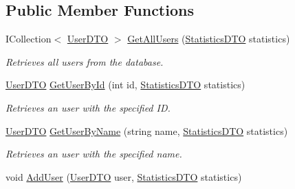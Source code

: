 \subsection*{Public Member Functions}
\begin{DoxyCompactItemize}
\item 
I\+Collection$<$ \mbox{\hyperlink{class_gielda_l2_1_1_i_n_f_r_a_s_t_r_u_c_t_u_r_e_1_1_d_t_o_1_1_user_d_t_o}{User\+D\+TO}} $>$ \mbox{\hyperlink{interface_gielda_l2_1_1_i_n_f_r_a_s_t_r_u_c_t_u_r_e_1_1_interfaces_1_1_i_user_service_a3eccdbcf26de6b86ae770f0e3512664e}{Get\+All\+Users}} (\mbox{\hyperlink{class_gielda_l2_1_1_i_n_f_r_a_s_t_r_u_c_t_u_r_e_1_1_d_t_o_1_1_statistics_d_t_o}{Statistics\+D\+TO}} statistics)
\begin{DoxyCompactList}\small\item\em Retrieves all users from the database. \end{DoxyCompactList}\item 
\mbox{\hyperlink{class_gielda_l2_1_1_i_n_f_r_a_s_t_r_u_c_t_u_r_e_1_1_d_t_o_1_1_user_d_t_o}{User\+D\+TO}} \mbox{\hyperlink{interface_gielda_l2_1_1_i_n_f_r_a_s_t_r_u_c_t_u_r_e_1_1_interfaces_1_1_i_user_service_a2fd0719208e4bd393517dece3b039564}{Get\+User\+By\+Id}} (int id, \mbox{\hyperlink{class_gielda_l2_1_1_i_n_f_r_a_s_t_r_u_c_t_u_r_e_1_1_d_t_o_1_1_statistics_d_t_o}{Statistics\+D\+TO}} statistics)
\begin{DoxyCompactList}\small\item\em Retrieves an user with the specified ID. \end{DoxyCompactList}\item 
\mbox{\hyperlink{class_gielda_l2_1_1_i_n_f_r_a_s_t_r_u_c_t_u_r_e_1_1_d_t_o_1_1_user_d_t_o}{User\+D\+TO}} \mbox{\hyperlink{interface_gielda_l2_1_1_i_n_f_r_a_s_t_r_u_c_t_u_r_e_1_1_interfaces_1_1_i_user_service_a438bd5d0424677c7797ce1ec00d132dc}{Get\+User\+By\+Name}} (string name, \mbox{\hyperlink{class_gielda_l2_1_1_i_n_f_r_a_s_t_r_u_c_t_u_r_e_1_1_d_t_o_1_1_statistics_d_t_o}{Statistics\+D\+TO}} statistics)
\begin{DoxyCompactList}\small\item\em Retrieves an user with the specified name. \end{DoxyCompactList}\item 
void \mbox{\hyperlink{interface_gielda_l2_1_1_i_n_f_r_a_s_t_r_u_c_t_u_r_e_1_1_interfaces_1_1_i_user_service_a964c730457bbce497d33fed5fda0b103}{Add\+User}} (\mbox{\hyperlink{class_gielda_l2_1_1_i_n_f_r_a_s_t_r_u_c_t_u_r_e_1_1_d_t_o_1_1_user_d_t_o}{User\+D\+TO}} user, \mbox{\hyperlink{class_gielda_l2_1_1_i_n_f_r_a_s_t_r_u_c_t_u_r_e_1_1_d_t_o_1_1_statistics_d_t_o}{Statistics\+D\+TO}} statistics)

\end{DoxyCompactItemize}
